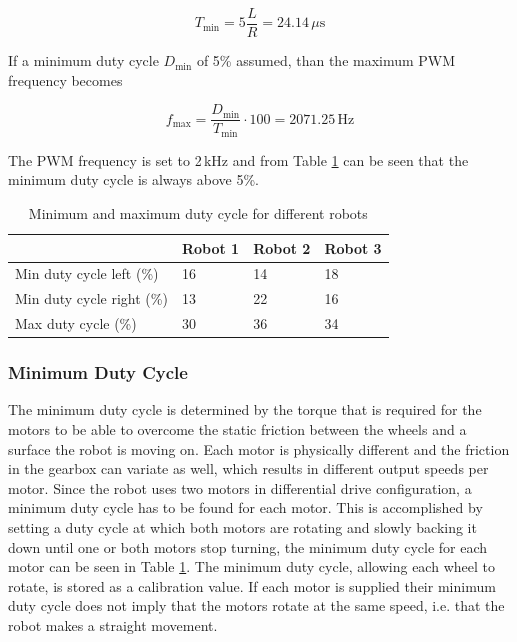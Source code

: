 \begin{equation}
T_{\min} = 5 \frac{L}{R} = 24.14\,\mu\text{s}
\end{equation}

\noindent
If a minimum duty cycle $D_{\min}$ of 5\% assumed, than the maximum PWM frequency becomes

\begin{equation}
f_{\max} = \frac{D_{\min}}{T_{\min}}\cdot 100 = 2071.25\,\text{Hz}
\end{equation}

\noindent
The PWM frequency is set to 2\,kHz and from Table \ref{tab:duty_cycle} can be seen that the minimum duty cycle is always above 5\%.

\begin{table}[t]
	\centering
	\caption{Minimum and maximum duty cycle for different robots}
	\label{tab:duty_cycle}
	\begin{tabular}{|l||l|l|l|} 
		\hline
						          & Robot 1 & Robot 2 & Robot 3 \\
		\hline \hline
 		Min duty cycle left (\%)  & 16      & 14      & 18      \\
		Min duty cycle right (\%) & 13      & 22      & 16      \\
		Max duty cycle (\%)       & 30      & 36      & 34	    \\
		\hline
	\end{tabular}
\end{table}

\subsubsection{Minimum Duty Cycle}

The minimum duty cycle is determined by the torque that is required for the motors to be able to overcome the static friction between the wheels and a surface the robot is moving on.
Each motor is physically different and the friction in the gearbox can variate as well, which results in different output speeds per motor.
Since the robot uses two motors in differential drive configuration, a minimum duty cycle has to be found for each motor.
This is accomplished by setting a duty cycle at which both motors are rotating and slowly backing it down until one or both motors stop turning, the minimum duty cycle for each motor can be seen in Table \ref{tab:duty_cycle}.
The minimum duty cycle, allowing each wheel to rotate, is stored as a calibration value.
If each motor is supplied their minimum duty cycle does not imply that the motors rotate at the same speed, i.e. that the robot makes a straight movement.

